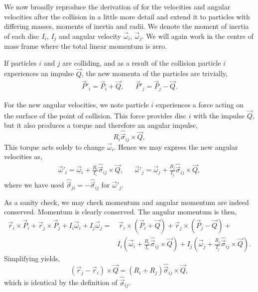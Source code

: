 \documentclass{article}
\begin{document}
We now broadly reproduce the derivation of \cite{Kremer-2014} for the velocities and angular velocities after the collision in a little more detail and extend it to particles with differing masses, moments of inertia and radii. We denote the moment of inertia of each disc $I_i$, $I_j$ and angular velocity $\vec{\omega}_i$, $\vec{\omega}_j$. We will again work in the centre of mass frame where the total linear momentum is zero.

If particles $i$ and $j$ are colliding, and as a result of the collision particle $i$ experiences an impulse $\vec{Q}$, the new momenta of the particles are trivially, 
\begin{align}
\label{eq:momenta-relations}
    \vec{P}'_i = \vec{P}_i + \vec{Q},
    &&
    \vec{P}'_j = \vec{P}_j - \vec{Q}.
\end{align}

For the new angular velocities, we note particle $i$ experiences a force acting on the surface of the point of collision. This force provides disc $i$ with the impulse $\vec{Q}$, but it also produces a torque and therefore an angular impulse,
\begin{equation}
    R_i \hat{\vec{\sigma}}_{ij} \times \vec{Q},
\end{equation}
This torque acts solely to change $\vec{\omega}_i$. Hence we may express the new angular velocities as,
\begin{align}
\label{eq:ang-velocity-relations}
    \vec{\omega}'_i = \vec{\omega}_i + \frac{R_i}{I_i} \hat{\vec{\sigma}}_{ij} \times \vec{Q},
    &&
    \vec{\omega}'_j = \vec{\omega}_j + \frac{R_j}{I_j} \hat{\vec{\sigma}}_{ij} \times \vec{Q},
\end{align}
where we have used $\hat{\vec{\sigma}}_{ji} = -\hat{\vec{\sigma}}_{ij}$ for $\vec{\omega}'_j$.

As a sanity check, we may check momentum and angular momentum are indeed conserved. Momentum is clearly conserved. The angular momentum is then,
\begin{align}
    \vec{r}_i \times \vec{P}_i + \vec{r}_j \times \vec{P}_j +
    I_i \vec{\omega}_i + I_j \vec{\omega}_j =& \,
    \vec{r}_i \times \left( \vec{P}_i + \vec{Q} \right) + 
    \vec{r}_j \times \left( \vec{P}_j - \vec{Q} \right) + \\
    & I_i \left( \vec{\omega}_i + \frac{R_i}{I_i} \hat{\vec{\sigma}}_{ij} \times \vec{Q} \right) +
    I_j \left( \vec{\omega}_j + \frac{R_j}{I_j} \hat{\vec{\sigma}}_{ij} \times \vec{Q} \right).
\end{align}
Simplifying yields,
\begin{equation}
    \left( \vec{r}_j - \vec{r}_i \right) \times \vec{Q}
    =
    \left( R_i + R_j \right) \hat{\vec{\sigma}}_{ij} \times \vec{Q},
\end{equation}
which is identical by the definition of $\hat{\vec{\sigma}}_{ij}$.
\end{document}
